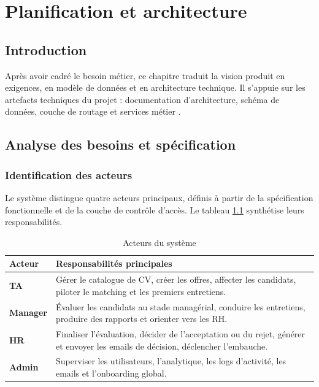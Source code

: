 \chapter{Planification et architecture}

\section*{Introduction}
Après avoir cadré le besoin métier, ce chapitre traduit la vision produit en exigences, en modèle de données et en architecture technique. Il s'appuie sur les artefacts techniques du projet : documentation d'architecture, schéma de données, couche de routage et services métier .

\section{Analyse des besoins et spécification}

\subsection{Identification des acteurs}
Le système distingue quatre acteurs principaux, définis à partir de la spécification fonctionnelle et de la couche de contrôle d'accès. Le tableau \ref{tab:system-actors} synthétise leurs responsabilités.

\begin{table}[H]
  \centering
  \caption{\label{tab:system-actors}Acteurs du système}
  \begin{tabularx}{\textwidth}{>{\bfseries}p{3cm}X}
    \toprule
    Acteur & Responsabilités principales \\
    \midrule
    TA & Gérer le catalogue de CV, créer les offres, affecter les candidats, piloter le matching et les premiers entretiens. \\
    Manager & Évaluer les candidats au stade managérial, conduire les entretiens, produire des rapports et orienter vers les RH. \\
    HR & Finaliser l'évaluation, décider de l'acceptation ou du rejet, générer et envoyer les emails de décision, déclencher l'embauche. \\
    Admin & Superviser les utilisateurs, l'analytique, les logs d'activité, les emails et l'onboarding global. \\
    \bottomrule
  \end{tabularx}
\end{table}

